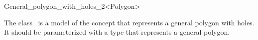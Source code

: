 \ccRefPageBegin

\begin{ccRefClass}{General_polygon_with_holes_2<Polygon>}

\ccThreeToTwo

\ccDefinition
The class \ccRefName\ is a model of the 
concept that represents a general polygon with holes. It should be
parameterized with a type  that represents a general polygon.

 
\ccIsModel

\end{ccRefClass}
\ccRefPageEnd

